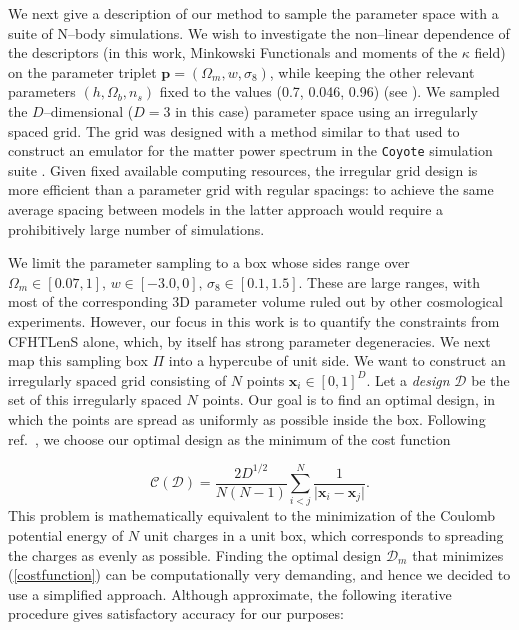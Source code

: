 \documentclass[reprint,aps,prd,superscriptaddress,showkeys,showpacs]{revtex4-1}
\begin{document}
We next give a description of our method to sample the parameter space
with a suite of N--body simulations. We wish to investigate the
non--linear dependence of the descriptors (in this work, Minkowski
Functionals and moments of the $\kappa$ field) on the parameter
triplet $\mathbf{p}=(\Omega_m,w,\sigma_8)$, while keeping the other
relevant parameters $(h,\Omega_b,n_s)$ fixed to the values (0.7,
0.046, 0.96) (see \citep{WMAP9}).
We sampled the $D$--dimensional ($D=3$ in this case) parameter space
using an irregularly spaced grid. The grid was designed with a method
similar to that used to construct an emulator for the matter power
spectrum in the \texttt{Coyote} simulation suite \citep{coyote2}.
Given fixed available computing resources, the irregular grid design
is more efficient than a parameter grid with regular spacings: to
achieve the same average spacing between models in the latter approach
would require a prohibitively large number of simulations.

We limit the parameter sampling to a box whose sides range over
$\Omega_m\in[0.07,1],\,w\in[-3.0,0],\,\sigma_8\in[0.1,1.5]$.  These
are large ranges, with most of the corresponding 3D parameter volume
ruled out by other cosmological experiments. However, our focus in
this work is to quantify the constraints from CFHTLenS alone, which,
by itself has strong parameter degeneracies.
We next map this sampling box $\Pi$ into a hypercube of unit side. We
want to construct an irregularly spaced grid consisting of $N$ points
$\mathbf{x}_i\in[0,1]^D$. Let a \textit{design} $\mathcal{D}$ be the
set of this irregularly spaced $N$ points. Our goal is to find an
optimal design, in which the points are spread as uniformly as
possible inside the box. Following ref.~\citep{coyote2}, we choose our
optimal design as the minimum of the cost function

\begin{equation}
\label{costfunction}
\mathcal{C}(\mathcal{D}) = \frac{2D^{1/2}}{N(N-1)}\sum_{i<j}^N\frac{1}{\vert\mathbf{x}_i-\mathbf{x}_j\vert}.
\end{equation} 
%
This problem is mathematically equivalent to the minimization of the
Coulomb potential energy of $N$ unit charges in a unit box, which
corresponds to spreading the charges as evenly as possible.
Finding the optimal design $\mathcal{D}_m$ that minimizes
(\ref{costfunction}) can be computationally very demanding, and hence
we decided to use a simplified approach. Although approximate, the
following iterative procedure gives satisfactory accuracy for our purposes:
\end{document}
